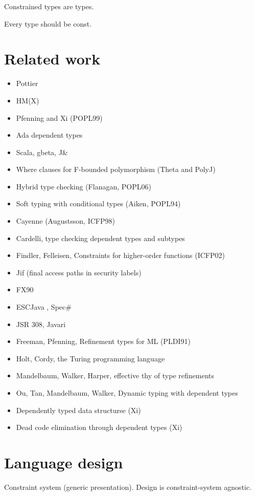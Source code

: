 \documentclass[nocopyrightspace,preprint,10pt]{sigplanconf}
\begin{document}
Constrained types are types.

Every type should be const.

\section{Related work}

\begin{itemize}
\item Pottier
\item HM(X)
\item Pfenning and Xi (POPL99)
\item Ada dependent types
\item Scala, gbeta, J\&
\item Where clauses for F-bounded polymorphism (Theta and PolyJ)
\item Hybrid type checking (Flanagan, POPL06)
\item Soft typing with conditional types (Aiken, POPL94)
\item Cayenne (Augustsson, ICFP98)
\item Cardelli, type checking dependent types and subtypes
\item Findler, Felleisen, Constraints for higher-order functions (ICFP02)
\item Jif (final access paths in security labels)
\item FX90
\item ESCJava \cite{esc-java}, Spec\#
\item JSR 308, Javari
\item Freeman, Pfenning, Refinement types for ML (PLDI91)
\item Holt, Cordy, the Turing programming language
\item Mandelbaum, Walker, Harper, effective thy of type refinements
\item Ou, Tan, Mandelbaum, Walker, Dynamic typing with dependent types
\item Dependently typed data structurse (Xi)
\item Dead code elimination through dependent types (Xi)
\end{itemize}

\section{Language design}

Constraint system (generic presentation).
Design is constraint-system agnostic.
\end{document}
